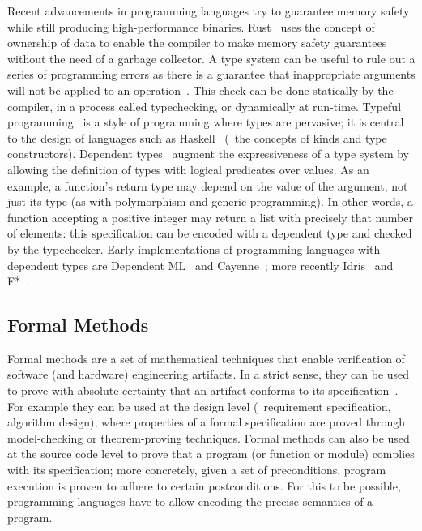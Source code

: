 Recent advancements in programming languages try to guarantee memory safety
while still producing high-performance binaries. Rust~\cite{Matsakis2014RL}
uses the concept of ownership of data to enable the compiler to make memory
safety guarantees without the need of a garbage collector. A type system can be
useful to rule out a series of programming errors as there is a guarantee that
inappropriate arguments will not be applied to an
operation~\cite{cardelli2004type}. This check can be done statically by the
compiler, in a process called typechecking, or dynamically at run-time. Typeful
programming~\cite{cardelli1991typeful} is a style of programming where types
are pervasive; it is central to the design of languages such as
Haskell~\cite{jones2003haskell} (\eg~the concepts of kinds and type
constructors). Dependent types~\cite{aspinall2004dependent} augment the
expressiveness of a type system by allowing the definition of types with
logical predicates over values. As an example, a function's return type may
depend on the value of the argument, not just its type (as with polymorphism
and generic programming). In other words, a function accepting a positive
integer may return a list with precisely that number of elements: this
specification can be encoded with a dependent type and checked by the
typechecker. Early implementations of programming languages with dependent
types are Dependent ML~\cite{xi1999dependent,xi2007dependent} and
Cayenne~\cite{Augustsson1998CLD}; more recently Idris~\cite{Brady11idris} and
F*~\cite{mumon}.

\subsection{Formal Methods}
Formal methods are a set of mathematical techniques that enable verification of
software (and hardware) engineering artifacts. In a strict sense, they can be
used to prove with absolute certainty that an artifact conforms to its
specification~\cite{Hall1990SMF}. For example they can be used at the design
level (\eg~requirement specification, algorithm design), where properties of a
formal specification are proved through model-checking or theorem-proving
techniques. Formal methods can also be used at the source code level to prove
that a program (or function or module) complies with its specification; more
concretely, given a set of preconditions, program execution is proven to adhere
to certain postconditions. For this to be possible, programming languages have
to allow encoding the precise semantics of a program.

